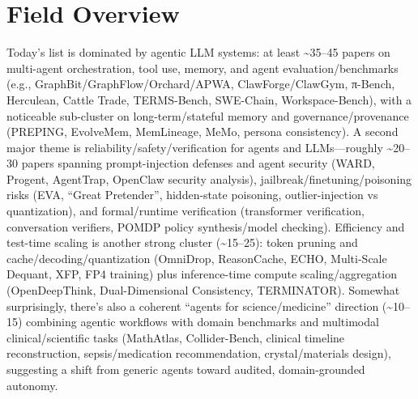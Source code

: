 \documentclass[12pt,letterpaper]{article}
\begin{document}
\section*{Field Overview}
{\footnotesize Today's list is dominated by agentic LLM systems: at least \textasciitilde{}35--45 papers on multi-agent orchestration, tool use, memory, and agent evaluation/benchmarks (e.g., GraphBit/GraphFlow/Orchard/APWA, ClawForge/ClawGym, π-Bench, Herculean, Cattle Trade, TERMS-Bench, SWE-Chain, Workspace-Bench), with a noticeable sub-cluster on long-term/stateful memory and governance/provenance (PREPING, EvolveMem, MemLineage, MeMo, persona consistency). A second major theme is reliability/safety/verification for agents and LLMs---roughly \textasciitilde{}20--30 papers spanning prompt-injection defenses and agent security (WARD, Progent, AgentTrap, OpenClaw security analysis), jailbreak/finetuning/poisoning risks (EVA, ``Great Pretender'', hidden-state poisoning, outlier-injection vs quantization), and formal/runtime verification (transformer verification, conversation verifiers, POMDP policy synthesis/model checking). Efficiency and test-time scaling is another strong cluster (\textasciitilde{}15--25): token pruning and cache/decoding/quantization (OmniDrop, ReasonCache, ECHO, Multi-Scale Dequant, XFP, FP4 training) plus inference-time compute scaling/aggregation (OpenDeepThink, Dual-Dimensional Consistency, TERMINATOR). Somewhat surprisingly, there's also a coherent ``agents for science/medicine'' direction (\textasciitilde{}10--15) combining agentic workflows with domain benchmarks and multimodal clinical/scientific tasks (MathAtlas, Collider-Bench, clinical timeline reconstruction, sepsis/medication recommendation, crystal/materials design), suggesting a shift from generic agents toward audited, domain-grounded autonomy.}
\end{document}
